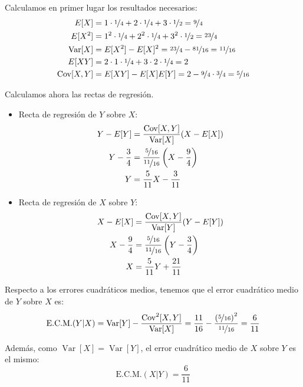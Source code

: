\documentclass[12pt]{article}
\DeclareMathOperator{\Var}{Var}
\DeclareMathOperator{\Cov}{Cov}
\begin{document}
\begin{ejercicio}
\begin{enumerate}
            Calculamos en primer lugar los resultados necesarios:
            \begin{align*}
                E[X]&=1\cdot \nicefrac{1}{4} + 2\cdot \nicefrac{1}{4} + 3\cdot \nicefrac{1}{2} = \nicefrac{9}{4} \\
                E[X^2]&=1^2\cdot \nicefrac{1}{4} + 2^2\cdot \nicefrac{1}{4} + 3^2\cdot \nicefrac{1}{2} = \nicefrac{23}{4} \\
                \Var[X] &= E[X^2] - E[X]^2 = \nicefrac{23}{4} - \nicefrac{81}{16} = \nicefrac{11}{16} \\
                E[XY] &= 2\cdot 1\cdot \nicefrac{1}{4}+3\cdot 2\cdot \nicefrac{1}{4}=2\\
                \Cov[X,Y] &= E[XY] - E[X]E[Y] = 2 - \nicefrac{9}{4}\cdot \nicefrac{3}{4} = \nicefrac{5}{16}
            \end{align*}

            Calculamos ahora las rectas de regresión.
            \begin{itemize}
                \item Recta de regresión de $Y$ sobre $X$:
                \begin{align*}
                    Y-E[Y] &= \dfrac{\Cov[X,Y]}{\Var[X]}(X-E[X]) \\
                    Y-\frac{3}{4} &= \dfrac{\nicefrac{5}{16}}{\nicefrac{11}{16}}\left(X-\frac{9}{4}\right) \\
                    Y &= \dfrac{5}{11}X - \dfrac{3}{11}
                \end{align*}

                \item Recta de regresión de $X$ sobre $Y$:
                \begin{align*}
                    X-E[X] &= \dfrac{\Cov[X,Y]}{\Var[Y]}(Y-E[Y]) \\
                    X-\frac{9}{4} &= \dfrac{\nicefrac{5}{16}}{\nicefrac{11}{16}}\left(Y-\frac{3}{4}\right) \\
                    X &= \dfrac{5}{11}Y + \dfrac{21}{11}
                \end{align*}
            \end{itemize}

            Respecto a los errores cuadráticos medios, tenemos que el error cuadrático medio de $Y$ sobre $X$ es:
            \begin{equation*}
                \text{E.C.M.}(Y|X) = \Var[Y] - \dfrac{\Cov^2[X,Y]}{\Var[X]} = \frac{11}{16} - \dfrac{\left(\nicefrac{5}{16}\right)^2}{\nicefrac{11}{16}} = \frac{6}{11}
            \end{equation*}

            Además, como $\Var[X]=\Var[Y]$, el error cuadrático medio de $X$ sobre $Y$ es el mismo:
            \begin{equation*}
                \text{E.C.M.}(X|Y) = \frac{6}{11}
            \end{equation*}
        \end{enumerate}
    \end{ejercicio}
\end{document}
